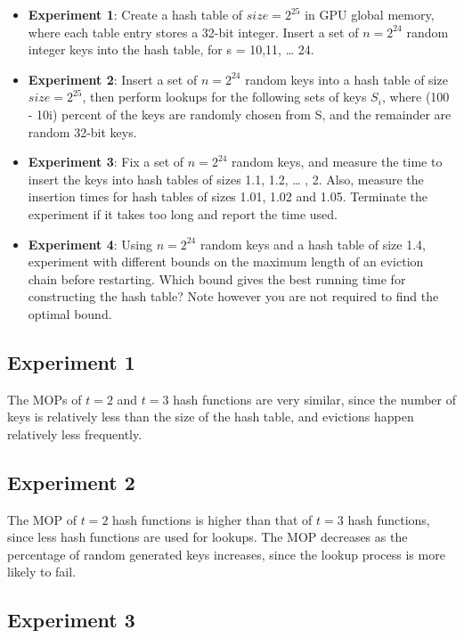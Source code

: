\documentclass{article}
\begin{document}
\begin{itemize}
    \item \textbf{Experiment 1}: Create a hash table of $size=2^{25}$ in GPU global memory, where each table entry stores a
    32-bit integer. Insert a set of $n=2^{24}$ random integer keys into the hash table, for s =
    10,11, … 24.
    \item \textbf{Experiment 2}: Insert a set of $n=2^{24}$ random keys into a hash table of size $size=2^{25}$, then perform lookups
    for the following sets of keys $S_i$, where
    (100 - 10i) percent of the keys are randomly chosen from S, and the remainder are
    random 32-bit keys.
    \item \textbf{Experiment 3}: Fix a set of $n=2^{24}$ random keys, and measure the time to insert the keys into hash
    tables of sizes 1.1, 1.2, … , 2. Also, measure the insertion times for hash tables of
    sizes 1.01, 1.02 and 1.05. Terminate the experiment if it takes too long and report
    the time used.
    \item \textbf{Experiment 4}: Using $n=2^{24}$ random keys and a hash table of size 1.4, experiment with different
    bounds on the maximum length of an eviction chain before restarting. Which bound
    gives the best running time for constructing the hash table? Note however you are not
    required to find the optimal bound.
\end{itemize}

\subsection{Experiment 1}

The MOPs of $t=2$ and $t=3$ hash functions are very similar, since the number of keys is relatively less than the size of the hash table, and evictions happen relatively less frequently.

\subsection{Experiment 2}

The MOP of $t=2$ hash functions is higher than that of $t=3$ hash functions, since less hash functions are used for lookups. The MOP decreases as the percentage of random generated keys increases, since the lookup process is more likely to fail.

\subsection{Experiment 3}
\end{document}
